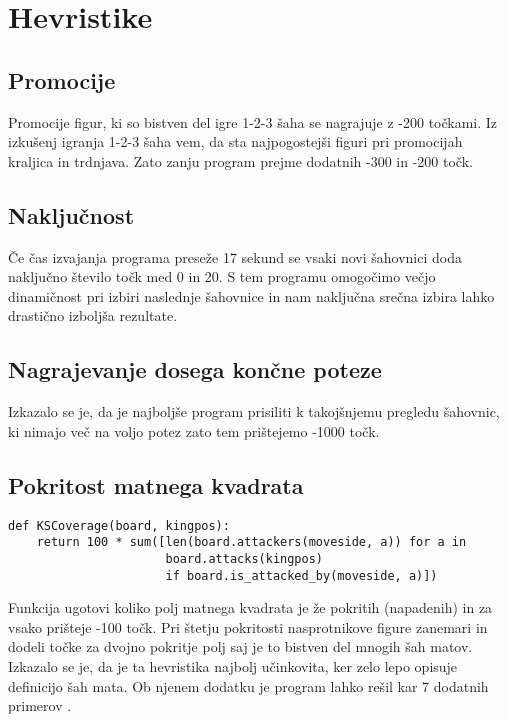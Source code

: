 \documentclass[runningheads]{llncs}
\begin{document}
\section{Hevristike}

\subsection{Promocije}
Promocije figur, ki so bistven del igre 1-2-3 šaha se nagrajuje z -200 točkami. Iz izkušenj igranja 1-2-3 šaha vem, da sta najpogostejši figuri pri promocijah kraljica in trdnjava. Zato zanju program prejme dodatnih -300 in -200 točk.
\\
\subsection{Naključnost}
Če čas izvajanja programa preseže 17 sekund se vsaki novi šahovnici doda naključno število točk med 0 in 20. S tem programu omogočimo večjo dinamičnost pri izbiri naslednje šahovnice in nam naključna srečna izbira lahko drastično izboljša rezultate.
\\
\subsection{Nagrajevanje dosega končne poteze}
Izkazalo se je, da je najboljše program prisiliti k takojšnjemu pregledu šahovnic, ki nimajo več na voljo potez zato tem prištejemo -1000 točk.
\\
\subsection{Pokritost matnega kvadrata}
\begin{lstlisting}
def KSCoverage(board, kingpos):
    return 100 * sum([len(board.attackers(moveside, a)) for a in
                      board.attacks(kingpos)
                      if board.is_attacked_by(moveside, a)])
\end{lstlisting}
Funkcija ugotovi koliko polj matnega kvadrata je že pokritih (napadenih) in za vsako prišteje -100 točk. Pri štetju pokritosti nasprotnikove figure zanemari in dodeli točke za dvojno pokritje polj saj je to bistven del mnogih šah matov. Izkazalo se je, da je ta hevristika najbolj učinkovita, ker zelo lepo opisuje definicijo šah mata. Ob njenem dodatku je program lahko rešil kar 7 dodatnih primerov \cite{janko2015razvoj}. 
\\
\end{document}
